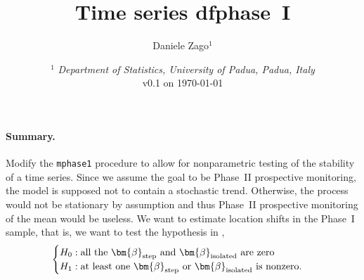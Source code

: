 \documentclass{article}
\author{Daniele Zago$^1$}
\title{Time series dfphase~I}
\date{%
\smaller
$^1$ \textit{Department of Statistics, University of Padua, Padua, Italy}\\%
v0.1 on \today}
\begin{document}
\maketitle

\paragraph{Summary.} Modify the \texttt{mphase1} procedure to allow for nonparametric testing of the stability of a time series.
Since we assume the goal to be Phase~II prospective monitoring, the model is supposed not to contain a stochastic trend.
Otherwise, the process would not be stationary by assumption and thus Phase~II prospective monitoring of the mean would be useless.
We want to estimate location shifts in the Phase~I sample, that is, we want to test the hypothesis in \textcite{capizzi2017},
\[
    \begin{cases}
        H_0: \text{all the $ \bm{\beta}_{\text{step}}$ and $ \bm{\beta}_\text{isolated}$ are zero}\\
        H_1: \text{at least one $ \bm{\beta}_\text{step}$ or $ \bm{\beta}_\text{isolated}$ is nonzero}.
    \end{cases}
\]
\end{document}
